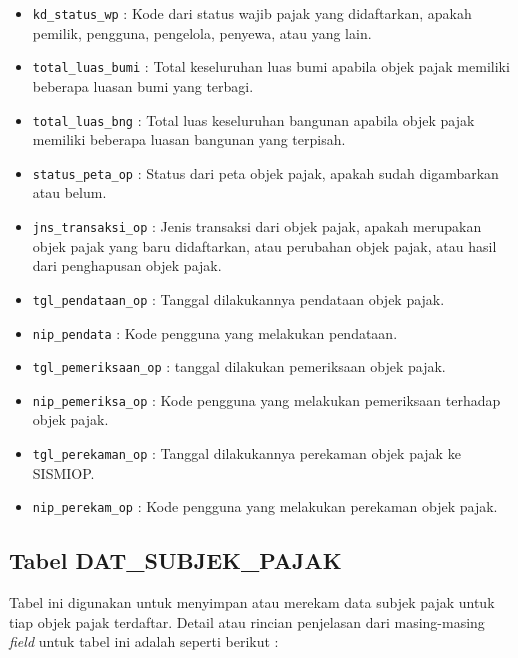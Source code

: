 \begin{itemize}
	\item \texttt{kd\_status\_wp} : Kode dari status wajib pajak yang didaftarkan, apakah pemilik, pengguna, pengelola, penyewa, atau yang lain.
	\item \texttt{total\_luas\_bumi} : Total keseluruhan luas bumi apabila objek pajak memiliki beberapa luasan bumi yang terbagi.
	\item \texttt{total\_luas\_bng} : Total luas keseluruhan bangunan apabila objek pajak memiliki beberapa luasan bangunan yang terpisah.
	\item \texttt{status\_peta\_op} : Status dari peta objek pajak, apakah sudah digambarkan atau belum.
	\item \texttt{jns\_transaksi\_op} : Jenis transaksi dari objek pajak, apakah merupakan objek pajak yang baru didaftarkan, atau perubahan objek pajak, atau hasil dari penghapusan objek pajak.
	\item \texttt{tgl\_pendataan\_op} : Tanggal dilakukannya pendataan objek pajak.
	\item \texttt{nip\_pendata} : Kode pengguna yang melakukan pendataan.
	\item \texttt{tgl\_pemeriksaan\_op} : tanggal dilakukan pemeriksaan objek pajak.
	\item \texttt{nip\_pemeriksa\_op} : Kode pengguna yang melakukan pemeriksaan terhadap objek pajak.
	\item \texttt{tgl\_perekaman\_op} : Tanggal dilakukannya perekaman objek pajak ke SISMIOP.
	\item \texttt{nip\_perekam\_op} : Kode pengguna yang melakukan perekaman objek pajak.
\end{itemize}

\subsection{Tabel DAT\_SUBJEK\_PAJAK}

Tabel ini digunakan untuk menyimpan atau merekam data subjek pajak untuk tiap objek pajak terdaftar. Detail atau rincian penjelasan dari masing-masing \textit{field} untuk tabel ini adalah seperti berikut :

